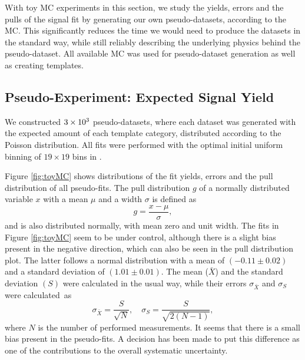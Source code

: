 With toy MC experiments in this section, we study the yields, errors and the pulls of the signal fit by generating our own pseudo-datasets, according to the MC. This significantly reduces the time we would need to produce the datasets in the standard way, while still reliably describing the underlying physics behind the pseudo-dataset. All available MC was used for pseudo-dataset generation as well as creating templates. 

\subsection{Pseudo-Experiment: Expected Signal Yield}

We constructed $3\times 10^{3}$ pseudo-datasets, where each dataset was generated with the expected amount of each template category, distributed according to the Poisson distribution. All fits were performed with the optimal initial uniform binning of $19 \times 19$ bins in \vars.

Figure \ref{fig:toyMC} shows distributions of the fit yields, errors and the pull distribution of all pseudo-fits. The pull distribution $g$ \cite{demortier2002everything} of a normally distributed variable $x$ with a mean $\mu$ and a width $\sigma$ is defined as 
\begin{equation}
g = \frac{x-\mu}{\sigma},
\end{equation}
and is also distributed normally, with mean zero and unit width. The fits in Figure \ref{fig:toyMC} seem to be under control, although there is a slight bias present in the negative direction, which can also be seen in the pull distribution plot. The latter follows a normal distribution with a mean of $(-0.11\pm0.02)$ and a standard deviation of $(1.01\pm0.01)$. The mean ($\bar X$) and the standard deviation $(S)$ were calculated in the usual way, while their errors $\sigma_{\bar X}$ and $\sigma_S$ were calculated~as~\cite{ahn2003standard}
\begin{equation}
\sigma_{\bar X} = \frac{S}{\sqrt{N}},\quad \sigma_{S} = \frac{S}{\sqrt{2(N-1)}},
\end{equation}
where $N$ is the number of performed measurements. It seems that there is a small bias present in the pseudo-fits. A decision has been made to put this difference as one of the contributions to the overall systematic uncertainty.

